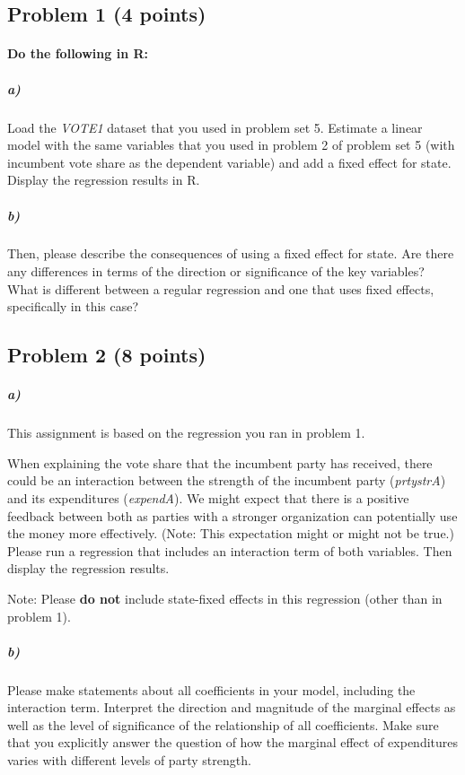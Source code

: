 \documentclass[12pt]{article}
\begin{document}
\subsection*{Problem 1 (4 points)}

\paragraph{Do the following in R:}

\subparagraph{a)} Load the \textit{VOTE1} dataset that you used in problem set 5. Estimate a linear model with the same variables that you used in problem 2 of problem set 5 (with incumbent vote share as the dependent variable) and add a fixed effect for state. Display the regression results in R.

\subparagraph{b)} Then, please describe the consequences of using a fixed effect for state. Are there any differences in terms of the direction or significance of the key variables? What is different between a regular regression and one that uses fixed effects, specifically in this case?



\subsection*{Problem 2 (8 points)}

\subparagraph{a)} This assignment is based on the regression you ran in problem 1.

When explaining the vote share that the incumbent party has received, there could be an interaction between the strength of the incumbent party (\textit{prtystrA}) and its expenditures (\textit{expendA}). We might expect that there is a positive feedback between both as parties with a stronger organization can potentially use the money more effectively. (Note: This expectation might or might not be true.) Please run a regression that includes an interaction term of both variables. Then display the regression results.

Note: Please \textbf{do not} include state-fixed effects in this regression (other than in problem 1).

\subparagraph{b)} Please make statements about all coefficients in your model, including the interaction term. Interpret the direction and magnitude of the marginal effects as well as the level of significance of the relationship of all coefficients. Make sure that you explicitly answer the question of how the marginal effect of expenditures varies with different levels of party strength.
\end{document}
